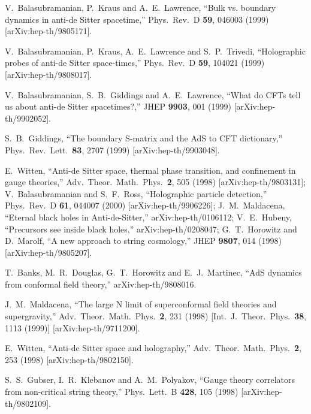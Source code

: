 \documentclass[a4paper,aps,prd,preprintnumbers,groupedaddress]{revtex4}
\begin{document}
\begin{references}
 V.~Balasubramanian, P.~Kraus and A.~E.~Lawrence,
``Bulk vs. boundary dynamics in anti-de Sitter spacetime,'' Phys.\ Rev.\ D {\bf 59}, 046003 (1999) [arXiv:hep-th/9805171].

 V.~Balasubramanian, P.~Kraus, A.~E.~Lawrence and S.~P.~Trivedi,
``Holographic probes of anti-de Sitter space-times,'' Phys.\ Rev.\ D {\bf 59}, 104021 (1999) [arXiv:hep-th/9808017].


 V.~Balasubramanian, S.~B.~Giddings and A.~E.~Lawrence,
``What do CFTs tell us about anti-de Sitter spacetimes?,'' JHEP {\bf 9903}, 001 (1999) [arXiv:hep-th/9902052].


 S.~B.~Giddings,
``The boundary S-matrix and the AdS to CFT dictionary,'' Phys.\ Rev.\ Lett.\  {\bf 83}, 2707 (1999) [arXiv:hep-th/9903048].


E.~Witten,
``Anti-de Sitter space, thermal phase transition, and confinement in  gauge theories,''
Adv.\ Theor.\ Math.\ Phys.\  {\bf 2}, 505 (1998)
[arXiv:hep-th/9803131];
V.~Balasubramanian and S.~F.~Ross,
``Holographic particle detection,''
Phys.\ Rev.\ D {\bf 61}, 044007 (2000)
[arXiv:hep-th/9906226];
J.~M.~Maldacena,
``Eternal black holes in Anti-de-Sitter,''
arXiv:hep-th/0106112;
V.~E.~Hubeny,
``Precursors see inside black holes,''
arXiv:hep-th/0208047;
G.~T.~Horowitz and D.~Marolf,
``A new approach to string cosmology,''
JHEP {\bf 9807}, 014 (1998)
[arXiv:hep-th/9805207].

 T.~Banks, M.~R.~Douglas, G.~T.~Horowitz and E.~J.~Martinec,
``AdS dynamics from conformal field theory,'' arXiv:hep-th/9808016.


 J.~M.~Maldacena,
``The large N limit of superconformal field theories and supergravity,'' Adv.\ Theor.\ Math.\ Phys.\  {\bf 2}, 231 (1998) [Int.\ J.\ Theor.\
Phys.\  {\bf 38}, 1113 (1999)] [arXiv:hep-th/9711200].

 E.~Witten,
``Anti-de Sitter space and holography,'' Adv.\ Theor.\ Math.\ Phys.\  {\bf 2}, 253 (1998) [arXiv:hep-th/9802150].


 S.~S.~Gubser, I.~R.~Klebanov and A.~M.~Polyakov,
``Gauge theory correlators from non-critical string theory,'' Phys.\ Lett.\ B {\bf 428}, 105 (1998) [arXiv:hep-th/9802109].



\end{references}
\end{document}
